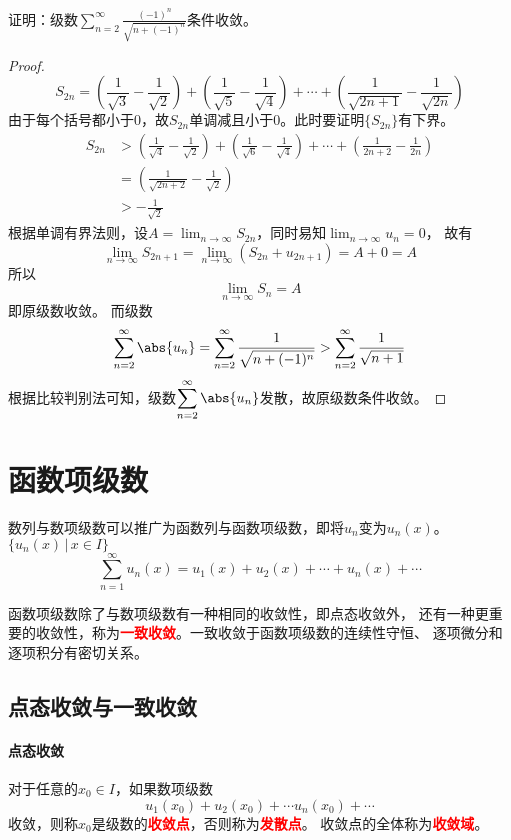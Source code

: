 \begin{example}
    证明：级数$\displaystyle\sum_{n=2}^\infty \frac{(-1)^n}{\sqrt{n + (-1)^n}}$条件收敛。
\end{example}
\begin{proof}
    \[
        S_{2n}
        = \left(\frac{1}{\sqrt{3}} - \frac{1}{\sqrt{2}}\right)
        + \left(\frac{1}{\sqrt{5}}-\frac{1}{\sqrt{4}}\right)
        + \cdots
        + \left(\frac{1}{\sqrt{2n+1}} - \frac{1}{\sqrt{2n}}\right)
    \]
    由于每个括号都小于$0$，故$S_{2n}$单调减且小于$0$。此时要证明$\{S_{2n}\}$有下界。
    \begin{align*}
        S_{2n}
         & > \left(\frac{1}{\sqrt{4}} - \frac{1}{\sqrt{2}}\right)
        + \left(\frac{1}{\sqrt{6}}-\frac{1}{\sqrt{4}}\right)
        + \cdots
        + \left(\frac{1}{2n+2} - \frac{1}{2n}\right)              \\
         & =
        \left(\frac{1}{\sqrt{2n+2}} - \frac{1}{\sqrt{2}}\right)   \\
         & > -\frac{1}{\sqrt{2}}
    \end{align*}
    根据单调有界法则，设$\displaystyle A = \lim_{n\to\infty} S_{2n}$，同时易知$\displaystyle \lim_{n\to\infty} u_n = 0$，
    故有
    \[ \lim_{n\to\infty} S_{2n+1} = \lim_{n\to\infty} (S_{2n} +u_{2n+1}) = A + 0 = A \]
    所以
    \[ \lim_{n\to\infty} S_n = A \]
    即原级数收敛。
    而级数
    \[
        \sum_{n=2}^\infty \abs{u_n}
        =
        \sum_{n=2}^\infty \frac{1}{\sqrt{n+(-1)^n}}
        >
        \sum_{n=2}^\infty \frac{1}{\sqrt{n+1}}
    \]
    根据比较判别法可知，级数$\displaystyle\sum_{n=2}^\infty \abs{u_n}$发散，故原级数条件收敛。
\end{proof}

\section{函数项级数}
数列与数项级数可以推广为函数列与函数项级数，即将$u_n$变为$u_n(x)$。$\{u_n(x)\,|\,x\in I\}$
\[ \sum_{n=1}^\infty u_n(x) = u_1(x) + u_2(x) + \cdots + u_n(x) + \cdots \]

函数项级数除了与数项级数有一种相同的收敛性，即点态收敛外，
还有一种更重要的收敛性，称为\textcolor{red}{\textbf{\textsf{一致收敛}}}。一致收敛于函数项级数的连续性守恒、
逐项微分和逐项积分有密切关系。

\subsection{点态收敛与一致收敛}
\paragraph{点态收敛}
对于任意的$x_0\in I$，如果数项级数
\[ u_1(x_0) + u_2(x_0) + \cdots u_n(x_0) + \cdots \]
收敛，则称$x_0$是级数的\textcolor{red}{\textbf{\textsf{收敛点}}}，否则称为\textcolor{red}{\textbf{\textsf{发散点}}}。
收敛点的全体称为\textcolor{red}{\textbf{\textsf{收敛域}}}。

